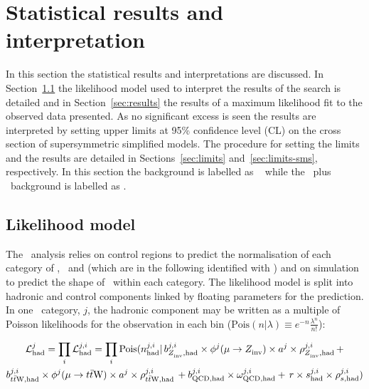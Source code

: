 \chapter{Statistical results and interpretation}
\label{cha:statisticalResults}

In this section the statistical results and interpretations are discussed.
In Section~\ref{sec:likelihood} the likelihood model used to interpret the results of the \alphat search is
detailed and in Section~\ref{sec:results} the results of a maximum likelihood fit to the observed data presented. 
As no significant excess is seen the results are interpreted by setting upper limits at 95\% confidence 
level (CL) on the cross section of supersymmetric simplified models. The procedure for setting the limits and 
the results are detailed in Sections~\ref{sec:limits} and~\ref{sec:limits-sms}, respectively.
In this section the \znunu background is labelled as \zInv~ while 
the \ttj~plus \wj~background is labelled as \ttW.

\section{Likelihood model}
\label{sec:likelihood}

The \alphat~analysis relies on control regions to predict the normalisation of each category of \njet, \nb~and \scalht 
(which are in the following identified with \htcat) and on simulation to predict the shape 
of \mht~within each category. The likelihood model is split into hadronic and control components
linked by floating parameters for the prediction. In one \htcat~category, $j$, 
the hadronic component may be written as a multiple of Poisson likelihoods
for the observation in each \mht bin 
($\mathrm{Pois}(n|\lambda) \equiv e^{-n}\frac{\lambda^{n}}{n!}$):

\begin{multline}
\label{eq:hadronicLikelihood}
\mathcal{L}^{j}_{\mathrm{had}} = \prod_i \mathcal{L}^{j,i}_{\mathrm{had}} = \prod_i \mathrm{Pois}(n^{j,i}_{\mathrm{had}} |\, b^{j,i}_{Z_{\rm inv}^{~},\mathrm{had}}\times\phi^{j}(\mu\rightarrow Z_{\rm inv}^{~})\times a^{j}\times\rho^{j,i}_{Z_{\rm inv}^{~},\mathrm{had}}\, + \\ 
b^{j,i}_{t\bar{t}\text{W},\mathrm{had}}\times\phi^{j}(\mu\rightarrow t\bar{t}\text{W})\times a^{j}\times\rho^{j,i}_{t\bar{t}\text{W},\mathrm{had}}\, + b^{j,i}_{\text{QCD},\mathrm{had}}\times\omega^{j,i}_{\text{QCD},\mathrm{had}} + \,r\times s^{j,i}_{\mathrm{had}}\times\rho^{j,i}_{s,\mathrm{had}}) 
\end{multline}

